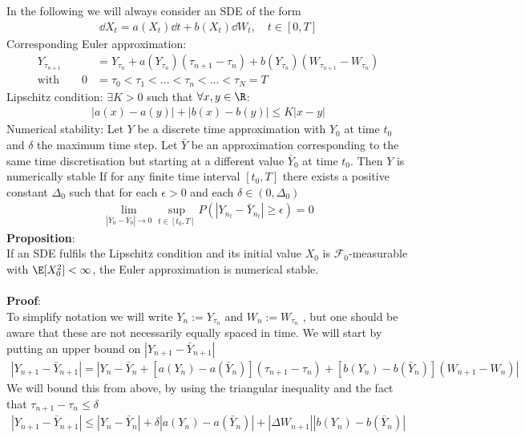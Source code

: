 In the following we will always consider an SDE of the form
\begin{align}
\dd X_t = a(X_t)\dd t + b(X_t) \dd W_t, \quad t\in[0,T]
\end{align}
Corresponding Euler approximation:
\begin{align}
Y_{\tau_{n+1}}&= Y_{\tau_{n}}+a(Y_{\tau_{n}})(\tau_{n+1}-\tau_{n})+b(Y_{\tau_{n}})(W_{\tau_{n+1}}-W_{\tau_{n}}) \label{eq:Euler_approx}\\
\text{with}\qquad0 &= \tau_{0}<\tau_{1}<...<\tau_{n}<...<\tau_{N} = T
\end{align}
Lipschitz condition: $\exists K>0$ such that $\forall x,y \in \R$: 
\begin{align}
|a(x)-a(y)|+|b(x)-b(y)|\leq K|x-y|\label{eq:Lip_cond}
\end{align}
Numerical stability: Let $Y$ be a discrete time approximation with $Y_0$ at time $t_0$ and $\delta$ the maximum time step. Let $\bar{Y}$ be an approximation corresponding to the same time discretisation but starting at a different value $\bar{Y}_0$ at time $t_0$. Then $Y$ is numerically stable If for any finite  time interval $[t_0,T]$ there exists a positive constant $\Delta_0$ such that for each $\epsilon>0$ and each $\delta \in (0,\Delta_0)$
\begin{align}
\lim_{|Y_0-\bar{Y}_0|\rightarrow 0}\sup_{t\in[t_0,T]} P\left(|Y_{n_t}-\bar{Y}_{n_t}|\geq \epsilon\right) =0
\end{align}
\textbf{Proposition}: \\
If an SDE fulfils the Lipschitz condition and its initial value $X_0$ is $\mathscr{F}_0$-measurable with $\E[X_0^2]<\infty$, the Euler approximation is numerical stable.\\ \\
\textbf{Proof}:\\
To simplify notation we will write $Y_n := Y_{\tau_n}$ and $W_n := W_{\tau_n}$ , but one should be aware that these are not necessarily equally spaced in time.
We will start by putting an upper bound on $\left|Y_{n+1}-\bar{Y}_{n+1}\right|$
\begin{align}
\left|Y_{n+1}-\bar{Y}_{n+1}\right| = \left|Y_n-\bar{Y}_{n}+[a(Y_n)-a(\bar{Y}_n)](\tau_{n+1}-\tau_n) +[b(Y_n)-b(\bar{Y}_n)](W_{n+1}-W_n)\right|
\end{align}
We will bound this from above, by using the triangular inequality and the fact that $\tau_{n+1}-\tau_n\leq \delta$
\begin{align}
\left|Y_{n+1}-\bar{Y}_{n+1}\right| \leq  \left|Y_n-\bar{Y}_{n}\right|+\delta\left|a(Y_n)-a(\bar{Y}_n)\right| +\left|\Delta W_{n+1}\right|\left|b(Y_n)-b(\bar{Y}_n)\right|
\end{align}
